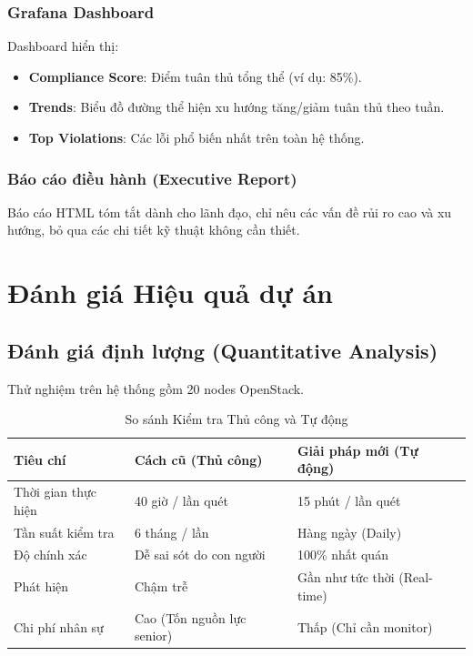 \documentclass[12pt,a4paper]{report}
\begin{document}
\subsection{Grafana Dashboard}
Dashboard hiển thị:
\begin{itemize}
    \item \textbf{Compliance Score}: Điểm tuân thủ tổng thể (ví dụ: 85\%).
    \item \textbf{Trends}: Biểu đồ đường thể hiện xu hướng tăng/giảm tuân thủ theo tuần.
    \item \textbf{Top Violations}: Các lỗi phổ biến nhất trên toàn hệ thống.
\end{itemize}

\subsection{Báo cáo điều hành (Executive Report)}
Báo cáo HTML tóm tắt dành cho lãnh đạo, chỉ nêu các vấn đề rủi ro cao và xu hướng, bỏ qua các chi tiết kỹ thuật không cần thiết.

\chapter{Đánh giá Hiệu quả dự án}

\section{Đánh giá định lượng (Quantitative Analysis)}
Thử nghiệm trên hệ thống gồm 20 nodes OpenStack.

\begin{table}[H]
    \centering
    \caption{So sánh Kiểm tra Thủ công và Tự động}
    \begin{tabular}{|l|p{5cm}|p{5cm}|}
    \hline
    \textbf{Tiêu chí} & \textbf{Cách cũ (Thủ công)} & \textbf{Giải pháp mới (Tự động)} \\
    \hline
    Thời gian thực hiện & 40 giờ / lần quét & 15 phút / lần quét \\
    \hline
    Tần suất kiểm tra & 6 tháng / lần & Hàng ngày (Daily) \\
    \hline
    Độ chính xác & Dễ sai sót do con người & 100\% nhất quán \\
    \hline
    Phát hiện & Chậm trễ & Gần như tức thời (Real-time) \\
    \hline
    Chi phí nhân sự & Cao (Tốn nguồn lực senior) & Thấp (Chỉ cần monitor) \\
    \hline
    \end{tabular}
    \label{tab:comparison}
\end{table}
\end{document}
